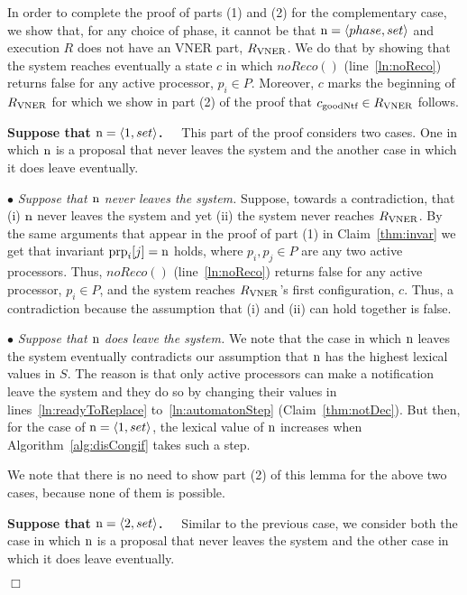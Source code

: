 \documentclass[11pt]{article}
\newcommand{\notif}{prp}
\newenvironment{proof}{\noindent{\bf Proof.}}{\hfill$\Box$}
\begin{document}
\begin{proof}
In order to complete the proof of parts (1) and (2) for the complementary case, we show that, for any choice of phase, it cannot be that $\textnormal{n}=\langle phase, set \rangle$ and execution $R$ does not have an VNER part, $R_{\textnormal{VNER}}$. We do that by showing that the system reaches eventually a state $c$ in which $noReco()$ (line~\ref{ln:noReco}) returns false for any active processor, $p_i \in P$. Moreover, $c$ marks the beginning of $R_{\textnormal{VNER}}$ for which we show in part (2) of the proof that $c_{\textnormal{goodNtf}} \in R_{\textnormal{VNER}}$ follows. 
    

\noindent \textbf{Suppose that $\textnormal{n} = \langle 1, set \rangle$.~~} This part of the proof considers two cases. One in which $\textnormal{n}$ is a proposal that never leaves the system and the another case in which it does leave eventually. 

\noindent $\bullet$ \textit{Suppose that $\textnormal{n}$ never leaves the system.}
Suppose, towards a contradiction, that (i) $\textnormal{n}$ never leaves the system and yet (ii) the system never reaches $R_{\textnormal{VNER}}$. By the same arguments that appear in the proof of part (1) in Claim~\ref{thm:invar} we get that invariant   
$\textnormal{\notif}_i[j] = \textnormal{n}$ holds, where $p_i, p_j \in P$ are any two active processors. Thus, $noReco()$ (line~\ref{ln:noReco}) returns false for any active processor, $p_i \in P$, and the system reaches $R_{\textnormal{VNER}}$'s first configuration, $c$. Thus, a contradiction because the assumption that (i) and (ii) can hold together is false.

\noindent$\bullet$ \textit{Suppose that $\textnormal{n}$ does leave the system.}
We note that the case in which $\textnormal{n}$ leaves the system eventually contradicts our assumption that $\textnormal{n}$ has the highest lexical values in $S$. The reason is that only active processors can make a notification leave the system and they do so by changing their values in lines~\ref{ln:readyToReplace} to~\ref{ln:automatonStep} (Claim~\ref{thm:notDec}). But then, for the case of $\textnormal{n} = \langle 1, set \rangle$, the lexical value of $\textnormal{n}$ increases when Algorithm~\ref{alg:disCongif} takes such a step.

We note that there is no need to show part (2) of this lemma for the above two cases, because none of them is possible. 


\noindent \textbf{Suppose that $\textnormal{n} = \langle 2, set \rangle$.~~}
Similar to the previous case, we consider both the case in which $\textnormal{n}$ is a proposal that never leaves the system and the other case in which it does leave eventually. 


\end{proof}
\end{document}
